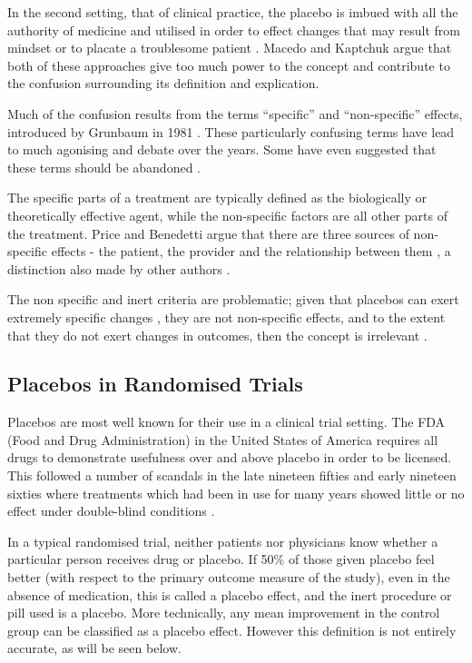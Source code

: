 In the second setting, that  of clinical practice, the placebo is imbued with all the authority of medicine and utilised in order to effect changes that may result from mindset or to placate a troublesome patient \cite{Bootzin2003,Sherman2008a}. Macedo and Kaptchuk argue that both of these approaches give too much power to the concept and contribute to the confusion surrounding its definition and explication. 

Much of the confusion results from the terms ``specific'' and ``non-specific'' effects, introduced by Grunbaum in 1981 \cite{grunbaum1981placebo}. These particularly confusing terms have lead to much agonising and debate over the years. Some have even suggested that these terms should be abandoned \cite{Caspi2002}. 

The specific parts of a treatment are typically defined as the biologically or theoretically effective agent, while the non-specific factors are all other parts of the treatment. Price and Benedetti argue that there are three sources of non-specific effects - the patient, the provider and the relationship between them \cite{Price2008}, a distinction also made by other authors \cite{Finniss2005}.

The non specific and inert criteria are problematic; given that placebos can exert extremely specific changes \cite{Amanzio2001,Caspi2002}, they are not non-specific effects, and to the extent that they do not exert changes in outcomes, then the concept is irrelevant \cite{Moerman2003,Barrett2006}.  

\subsection{Placebos in Randomised Trials}
\label{sec:plac-rand-trials}

Placebos are most well known for their use in a clinical trial setting. The FDA (Food and Drug Administration) in the United States of America  requires all drugs to demonstrate usefulness over and above placebo in order to be licensed. This followed a number of scandals in the late nineteen fifties and early nineteen sixties where treatments which had been in use for many years showed little or no effect under double-blind conditions \cite{Moerman2000a}. 

In a typical randomised trial, neither patients nor physicians know whether a particular person receives drug or placebo.  If 50\% of those given placebo feel  better (with respect to the primary outcome measure of the study), even in the absence of medication, this is called a placebo effect, and the inert procedure or pill used is a placebo. More technically, any mean improvement in the control group can be classified as a placebo effect. However this definition is not entirely accurate, as will be seen below.   


